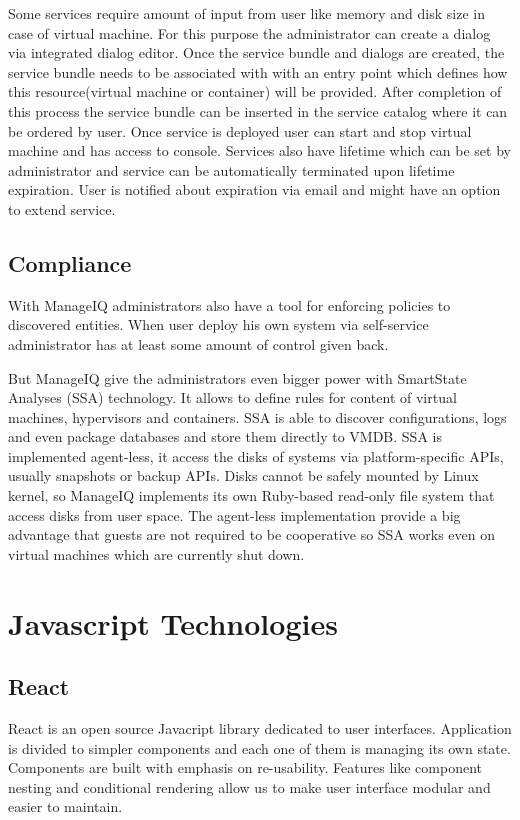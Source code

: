 Some services require amount of input from user like memory and disk size in case of virtual machine. For this purpose the administrator can create a dialog via integrated dialog editor. Once the service bundle and dialogs are created, the service bundle needs to be associated with with an entry point which defines how this resource(virtual machine or container) will be provided. After completion of this process the service bundle can be inserted in the service catalog where it can be ordered by user. Once service is deployed user can start and stop virtual machine and has access to console. Services also have lifetime which can be set by administrator and service can be automatically terminated upon lifetime expiration. User is notified about expiration via email and might have an option to extend service.

\section{Compliance}
With ManageIQ administrators also have a tool for enforcing policies to discovered entities. When user deploy his own system via self-service administrator has at least some amount of control given back.

But ManageIQ give the administrators even bigger power with SmartState Analyses (SSA) technology. It allows to define rules for content of virtual machines, hypervisors and containers. SSA is able to discover configurations, logs and even package databases and store them directly to VMDB. SSA is implemented agent-less, it access the disks of systems via platform-specific APIs, usually snapshots or backup APIs. Disks cannot be safely mounted by Linux kernel, so ManageIQ implements its own Ruby-based read-only file system that access disks from user space. The agent-less implementation provide a big advantage that guests are not required to be cooperative so SSA works even on virtual machines which are currently shut down.

\chapter{Javascript Technologies}

\section{React}
React is an open source Javacript library dedicated to user interfaces. Application is divided to simpler components and each one of them is managing its own state. Components are built with emphasis on re-usability. Features like component nesting and conditional rendering\cite{conditional} allow us to make user interface modular and easier to maintain.

